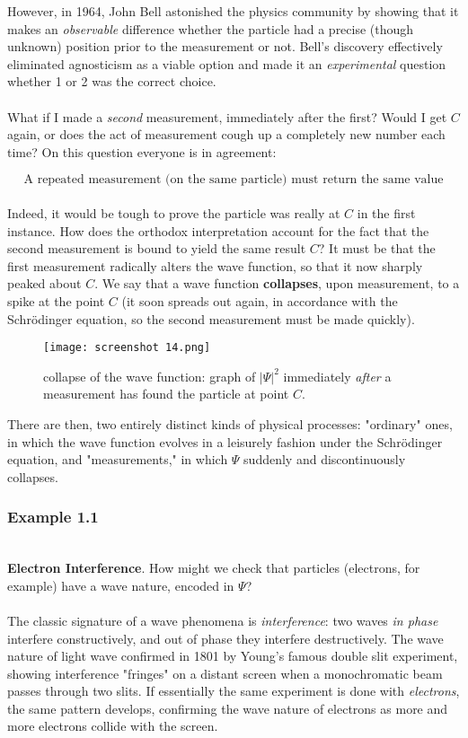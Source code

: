 \documentclass[svgnames]{article}   	%
\begin{document}
However, in 1964, John Bell astonished the physics community by showing that it
makes an \textit{observable} difference whether the particle had a precise
(though unknown) position prior to the measurement or not. Bell's discovery
effectively eliminated agnosticism as a viable option and made it an
\textit{experimental} question whether 1 or 2 was the correct choice. \\\\

What if I made a \textit{second} measurement, immediately after the first?
Would I get $C$ again, or does the act of measurement cough up a completely new
number each time? On this question everyone is in agreement: 

\[
\text{A repeated measurement (on the same particle) must return the same
value}    
\]\\

Indeed, it would be tough to prove the particle was really at $C$ in the first
instance. How does the orthodox interpretation account for the fact that the
second measurement is bound to yield the same result $C$? It must be that the
first measurement radically alters the wave function, so that it now sharply
peaked about $C$. We say that a wave function \textbf{collapses}, upon
measurement, to a spike at the point $C$ (it soon spreads out again, in
accordance with the Schr\"{o}dinger equation, so the second measurement must be
made quickly). 
\vspace{20px}
\begin{figure}[hb!]
  \centering
    \texttt{[image: screenshot 14.png]}
    \caption{collapse of the wave function: graph of $|\Psi|^2$ immediately
    \textit{after} a measurement has found the particle at point $C$.}
\end{figure}
\vspace{20px}
There are then, two entirely distinct kinds of physical processes: "ordinary"
ones, in which the wave function evolves in a leisurely fashion under the
Schr\"{o}dinger equation, and "measurements," in which $\Psi$ suddenly and
discontinuously collapses. 


\subsubsection{Example 1.1} \mbox{}\\

\textbf{Electron Interference}. How might we check that particles (electrons,
for example) have a wave nature, encoded in $\Psi$? \\\\
The classic signature of a wave phenomena is \textit{interference}: two waves
\textit{in phase} interfere constructively, and out of phase they interfere
destructively. The wave nature of light wave confirmed in 1801 by Young's
famous double slit experiment, showing interference "fringes" on a distant
screen when a monochromatic beam passes through two slits. If essentially the
same experiment is done with \textit{electrons}, the same pattern develops,
confirming the wave nature of electrons as more and more electrons collide with
the screen. 
\end{document}

